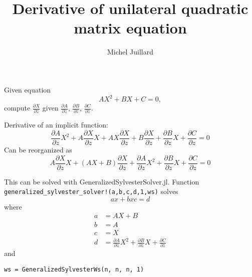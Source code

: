 \documentclass{article}
\title{Derivative of unilateral quadratic matrix equation}
\author{Michel Juillard}
\begin{document}
\maketitle

Given equation
\[
  AX^2 + BX + C = 0,
\]
compute $\frac{\partial X}{\partial z}$ given $\frac{\partial
  A}{\partial z}$, $\frac{\partial B}{\partial z}$, $\frac{\partial
  C}{\partial z}$.

Derivative of an implicit function:
\[
  \frac{\partial A}{\partial z}X^2 + A\frac{\partial X}{\partial z}X
  + AX\frac{\partial X}{\partial z} + B\frac{\partial X}{\partial z}
  + \frac{\partial B}{\partial z}X + \frac{\partial C}{\partial z} = 0
\]
Can be reorganized as
\[
  A\frac{\partial X}{\partial z}X
  + (AX + B)\frac{\partial X}{\partial z} +\frac{\partial A}{\partial z}X^2 
  + \frac{\partial B}{\partial z}X + \frac{\partial C}{\partial z} = 0
\]

This can be solved with GeneralizedSylvesterSolver.jl. Function
\verb+generalized_sylvester_solver!(a,b,c,d,1,ws)+ solves
\[
  ax + bxc = d
\]
where
\begin{align*}
  a &= AX + B\\
  b &= A\\
  c &= X\\
  d &= \frac{\partial A}{\partial z}X^2 
  + \frac{\partial B}{\partial z}X + \frac{\partial C}{\partial z}
\end{align*}
and
\begin{verbatim}
ws = GeneralizedSylvesterWs(n, n, n, 1)
\end{verbatim}
\end{document}
